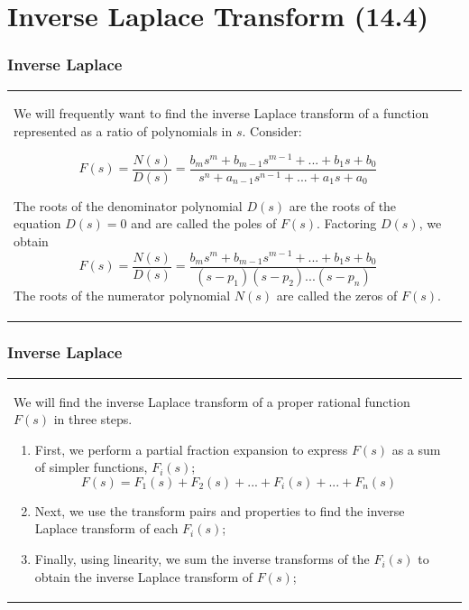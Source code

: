 \documentclass[aspectratio=169]{beamer}
\begin{document}
\section{Inverse Laplace Transform (14.4)}
\begin{frame}[fragile]
	\frametitle{Inverse Laplace }
\begin{tabular}{ll}

	\begin{columns}
	\small	\begin{column}{1\textwidth}  %
We will frequently want to find the inverse Laplace transform of a function represented as a ratio of
polynomials in $s$. Consider:

$$F(s)=\dfrac{N(s)}{D(s)}=\dfrac{b_ms^m+b_{m-1}s^{m-1}+...+b_{1}s+b_{0}}{s^n+a_{n-1}s^{n-1}+...+a_{1}s+a_{0}} $$

The roots of the denominator polynomial $D(s)$ are the roots of the equation $D(s)=0$ and are
called the poles of $F(s)$. Factoring $D(s)$, we obtain
$$F(s)=\dfrac{N(s)}{D(s)}=\dfrac{b_ms^m+b_{m-1}s^{m-1}+...+b_{1}s+b_{0}}{(s-p_1)(s-p_2)...(s-p_n)} $$
The roots of the numerator polynomial $N(s)$ are
called the zeros of $F(s)$.

		\end{column}

	
	\end{columns}\\


\end{tabular}	
\end{frame}
\begin{frame}[fragile]
	\frametitle{Inverse Laplace }
\begin{tabular}{ll}

	\begin{columns}
	\small	\begin{column}{1\textwidth}  %

	We will find the inverse Laplace transform of a proper rational function $F(s)$ in three steps.
	
	
	\small		\begin{enumerate}
\item{First, we perform a partial fraction expansion to express $F(s)$ as a sum of simpler functions, $F_i(s)$;}
$$ F(s)=F_1(s)+F_2(s)+...+F_i(s)+...+F_n(s)$$
\item{Next, we use the transform pairs and properties to find the inverse
Laplace transform of each $F_i(s)$;\newline}
\item{Finally, using linearity, we sum the inverse transforms of the $F_i(s)$ to
obtain the inverse Laplace transform of $F(s)$;\newline}			
					\end{enumerate}
					

		\end{column}

	
	\end{columns}\\


\end{tabular}	
\end{frame}
\end{document}

